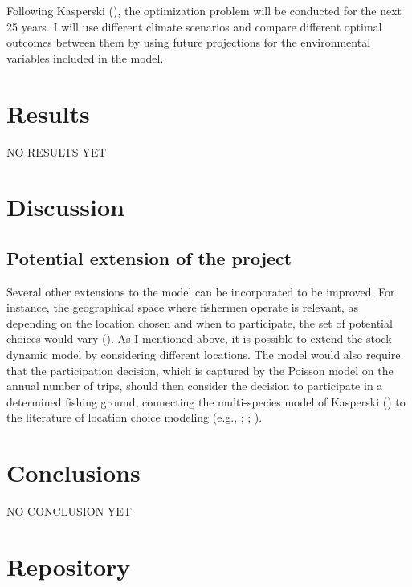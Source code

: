 \documentclass[
  11pt,
]{article}
\begin{document}
Following Kasperski (), the
optimization problem will be conducted for the next 25 years. I will use
different climate scenarios and compare different optimal outcomes
between them by using future projections for the environmental variables
included in the model.

\section{Results}\label{results}

NO RESULTS YET

\section{Discussion}\label{discussion}

\subsection{Potential extension of the
project}\label{potential-extension-of-the-project}

Several other extensions to the model can be incorporated to be
improved. For instance, the geographical space where fishermen operate
is relevant, as depending on the location chosen and when to
participate, the set of potential choices would vary
(). As I mentioned
above, it is possible to extend the stock dynamic model by considering
different locations. The model would also require that the participation
decision, which is captured by the Poisson model on the annual number of
trips, should then consider the decision to participate in a determined
fishing ground, connecting the multi-species model of Kasperski
() to the literature of location
choice modeling (e.g., ;
;
).

\section{Conclusions}\label{conclusions}

NO CONCLUSION YET

\section{Repository}\label{repository}
\end{document}

